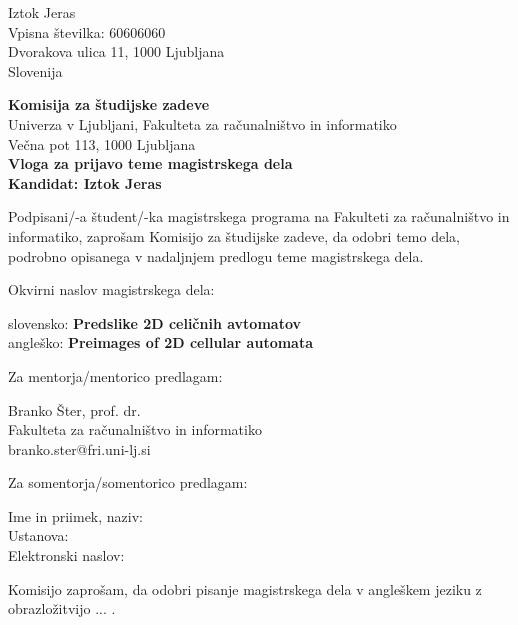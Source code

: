 \documentclass[a4paper, 12pt]{article}
\begin{document}
\noindent
Iztok Jeras\\
Vpisna številka: 60606060\\
Dvorakova ulica 11, 1000 Ljubljana\\
Slovenija


\bigskip

{\bf Komisija za študijske zadeve}\\
Univerza v Ljubljani, Fakulteta za računalništvo in informatiko\\
Večna pot 113, 1000 Ljubljana\\

{\Large\bf
{\centering
    Vloga za prijavo teme magistrskega dela \\%
\large Kandidat: Iztok Jeras \\[10mm]}}


Podpisani/-a študent/-ka magistrskega programa na Fakulteti za računalništvo in informatiko, zaprošam Komisijo za študijske zadeve, da odobri temo dela, podrobno opisanega v nadaljnjem predlogu teme magistrskega dela.

Okvirni naslov magistrskega dela:

\hfill\begin{minipage}{\dimexpr\textwidth-2cm}
slovensko: {\bf Predslike 2D celičnih avtomatov}\\
angleško: {\bf Preimages of 2D cellular automata}
\end{minipage}

Za mentorja/mentorico predlagam:

\hfill\begin{minipage}{\dimexpr\textwidth-2cm}
Branko Šter, prof. dr. \\
Fakulteta za računalništvo in informatiko \\
branko.ster@fri.uni-lj.si
\end{minipage}

Za somentorja/somentorico predlagam:

\hfill\begin{minipage}{\dimexpr\textwidth-2cm}
Ime in priimek, naziv: \\
Ustanova: \\
Elektronski naslov: \\
\end{minipage}

Komisijo zaprošam, da odobri pisanje magistrskega dela v angleškem jeziku z obrazložitvijo ... .
\end{document}
